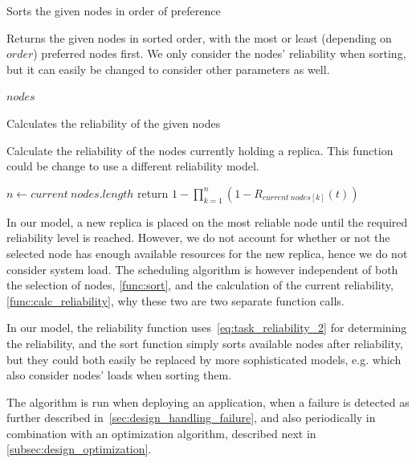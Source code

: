 \documentclass{cslthse-msc}
\begin{document}
\begin{function} 
	\caption{Sorts the given nodes in order of preference} \label{func:sort}
	Returns the given nodes in sorted order, with the most or least (depending on $order$) preferred nodes first. We only consider the nodes' reliability when sorting, but it can easily be changed to consider other parameters as well.
	\begin{algorithmic}[1]
	\Statex
		\State
	    \State \Return $nodes$
	\EndFunction
	\end{algorithmic}
\end{function}

\begin{function} 
	\caption{Calculates the reliability of the given nodes} \label{func:calc_reliability}
	Calculate the reliability of the nodes currently holding a replica. This function could be change to use a different reliability model.
	\begin{algorithmic}[1]
	\Statex
		\State $n\gets current\ nodes.length$
		\State return $ 1 - \prod\limits_{k=1}^n (1 - R_{current\ nodes[k]}(t))$
	\EndFunction
	\end{algorithmic}
\end{function}

In our model, a new replica is placed on the most reliable node until the required reliability level is reached. However, we do not account for whether or not the selected node has enough available resources for the new replica, hence we do not consider system load. The scheduling algorithm is however independent of both the selection of nodes, \cref{func:sort}, and the calculation of the current reliability, \cref{func:calc_reliability}, why these two are two separate function calls. 

In our model, the reliability function uses~\cref{eq:task_reliability_2} for determining the reliability, and the sort function simply sorts available nodes after reliability, but they could both easily be replaced by more sophisticated models, e.g. which also consider nodes' loads when sorting them.

The algorithm is run when deploying an application, when a failure is detected as further described in~\cref{sec:design_handling_failure}, and also periodically in combination with an optimization algorithm, described next in \cref{subsec:design_optimization}.
\end{document}
